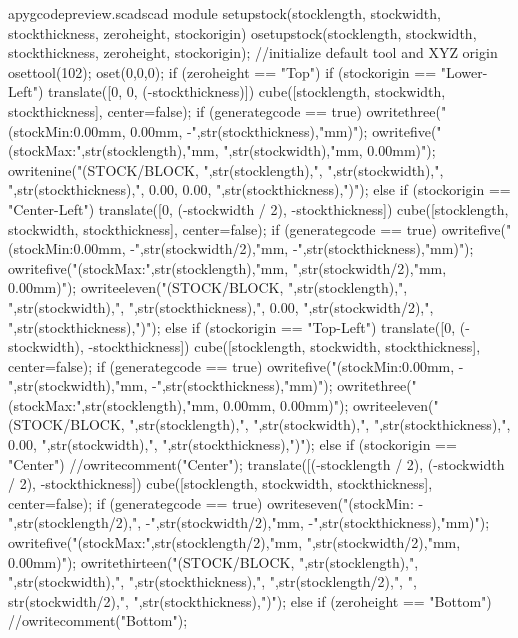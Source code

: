\documentclass{ltxdoc}
\begin{document}
\lstset{firstnumber=\thepyscad}
\begin{writecode}{a}{pygcodepreview.scad}{scad}
module setupstock(stocklength, stockwidth, stockthickness, zeroheight, stockorigin) {
  osetupstock(stocklength, stockwidth, stockthickness, zeroheight, stockorigin);
//initialize default tool and XYZ origin
  osettool(102);
  oset(0,0,0);
  if (zeroheight == "Top") {
    if (stockorigin == "Lower-Left") {
    translate([0, 0, (-stockthickness)]){
    cube([stocklength, stockwidth, stockthickness], center=false);
      if (generategcode == true) {
      owritethree("(stockMin:0.00mm, 0.00mm, -",str(stockthickness),"mm)");
      owritefive("(stockMax:",str(stocklength),"mm, ",str(stockwidth),"mm, 0.00mm)");
      owritenine("(STOCK/BLOCK, ",str(stocklength),", ",str(stockwidth),", ",str(stockthickness),", 0.00, 0.00, ",str(stockthickness),")");
    }
  }
}
     else if (stockorigin == "Center-Left") {
    translate([0, (-stockwidth / 2), -stockthickness]){
      cube([stocklength, stockwidth, stockthickness], center=false);
    if (generategcode == true) {
owritefive("(stockMin:0.00mm, -",str(stockwidth/2),"mm, -",str(stockthickness),"mm)");
owritefive("(stockMax:",str(stocklength),"mm, ",str(stockwidth/2),"mm, 0.00mm)");
    owriteeleven("(STOCK/BLOCK, ",str(stocklength),", ",str(stockwidth),", ",str(stockthickness),", 0.00, ",str(stockwidth/2),", ",str(stockthickness),")");
    }
  }
    } else if (stockorigin == "Top-Left") {
    translate([0, (-stockwidth), -stockthickness]){
      cube([stocklength, stockwidth, stockthickness], center=false);
if (generategcode == true) {
owritefive("(stockMin:0.00mm, -",str(stockwidth),"mm, -",str(stockthickness),"mm)");
owritethree("(stockMax:",str(stocklength),"mm, 0.00mm, 0.00mm)");
owriteeleven("(STOCK/BLOCK, ",str(stocklength),", ",str(stockwidth),", ",str(stockthickness),", 0.00, ",str(stockwidth),", ",str(stockthickness),")");
    }
  }
    }
    else if (stockorigin == "Center") {
//owritecomment("Center");
    translate([(-stocklength / 2), (-stockwidth / 2), -stockthickness]){
      cube([stocklength, stockwidth, stockthickness], center=false);
if (generategcode == true) {
owriteseven("(stockMin: -",str(stocklength/2),", -",str(stockwidth/2),"mm, -",str(stockthickness),"mm)");
owritefive("(stockMax:",str(stocklength/2),"mm, ",str(stockwidth/2),"mm, 0.00mm)");
owritethirteen("(STOCK/BLOCK, ",str(stocklength),", ",str(stockwidth),", ",str(stockthickness),", ",str(stocklength/2),", ", str(stockwidth/2),", ",str(stockthickness),")");
      }
    }
  }
} else if (zeroheight == "Bottom") {
//owritecomment("Bottom");
}}
\end{writecode}
\end{document}
